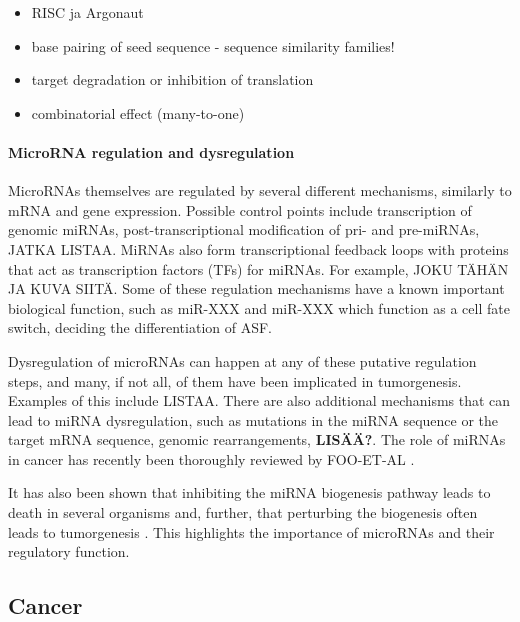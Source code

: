 \begin{itemize}
\tightlist
\item
  RISC ja Argonaut
\item
  base pairing of seed sequence - sequence similarity families!
\item
  target degradation or inhibition of translation
\item
  combinatorial effect (many-to-one)
\end{itemize}





\paragraph{MicroRNA regulation and dysregulation}\label{microrna-
regulation-and-dysregulation}

MicroRNAs themselves are regulated by several different mechanisms, similarly
to mRNA and gene expression. Possible control points include transcription of
genomic miRNAs, post-transcriptional modification of pri- and pre-miRNAs,
JATKA LISTAA. MiRNAs also form transcriptional feedback loops with proteins
that act as transcription factors (TFs) for miRNAs. For example, JOKU TÄHÄN JA
KUVA SIITÄ. Some of these regulation mechanisms have a known important
biological function, such as miR-XXX and miR-XXX which function as a cell fate
switch, deciding the differentiation of ASF.

Dysregulation of microRNAs can happen at any of these putative regulation
steps, and many, if not all, of them have been implicated in tumorgenesis.
Examples of this include LISTAA. There are also additional mechanisms that can
lead to miRNA dysregulation, such as mutations in the miRNA sequence or the
target mRNA sequence, genomic rearrangements,
\textbf{LISÄÄ?}. The role of miRNAs in cancer has recently been
thoroughly reviewed by FOO-ET-AL \citep{CITE}.

It has also been shown that inhibiting the miRNA biogenesis pathway leads to
death in several organisms \citep{CITE} and, further, that perturbing the
biogenesis often leads to tumorgenesis \citep{CITE}. This highlights the
importance of microRNAs and their regulatory function.












\subsection{Cancer}\label{cancer}

